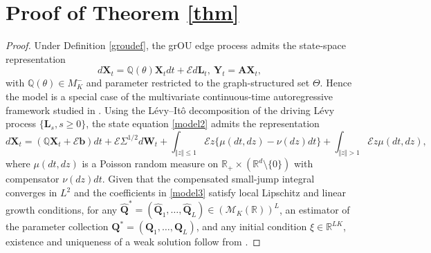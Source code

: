 \documentclass[12pt]{amsart}
\numberwithin{equation}{section}
\newcommand{\R}{\mathbb{R}}
\newcommand{\1}{\mathbf{1}}
\begin{document}
\section{Proof of Theorem \ref{thm}}
\label{thm_proof}
\begin{proof}
Under Definition \ref{groudef}, the grOU edge process admits the state-space representation
\begin{equation*}
d\mathbf{X}_t = \mathbb{Q}(\theta)\mathbf{X}_tdt + \mathcal{E}d\mathbf{L}_t,~\mathbf{Y}_t = \mathbf{AX}_t,
\end{equation*}
with $\mathbb{Q}(\theta)\in M_K^-$ and parameter restricted to the graph-structured set $\Theta$. Hence the model is a special case of the multivariate continuous-time autoregressive framework studied in \cite{lucchese2026estimation}. Using the L\'evy–It\^o decomposition of the driving L\'evy process $\{\mathbf{L}_s,s\geq 0\}$, the state equation \eqref{model2} admits the representation
\begin{equation}
\label{model3}
    d\mathbf{X}_t = (\mathbf{\mathbb{Q}}\mathbf{X}_t+\mathcal{E}\mathbf{b})dt + \mathcal{E}\Sigma^{1/2}d\mathbf{W}_t + \int_{\Vert z\Vert\leq 1}\mathcal{E}z\{\mu(dt,dz)-\nu(dz)dt\} + \int_{\Vert z\Vert>1}\mathcal{E}z\mu(dt,dz),
\end{equation}
where $\mu(dt,dz)$ is a Poisson random measure on $\R_+\times(\R^d\setminus\{0\})$ with compensator $\nu(dz)dt$. Given that the compensated small-jump integral converges in $L^2$ and the coefficients in \eqref{model3} satisfy local Lipschitz and linear growth conditions, for any $\hat{\mathbf{Q}}^*=(\hat{\mathbf{Q}}_1,\dots,\hat{\mathbf{Q}}_L)\in(\mathcal{M}_K(\R))^L$, an estimator of the parameter collection $\mathbf{Q}^* = (\mathbf{Q}_1,\dots,\mathbf{Q}_L)$, and any initial condition $\xi\in\R^{LK}$, existence and uniqueness of a weak solution follow from \cite[Proposition II.2.32]{jacod2013limit}. 


\end{proof}
\end{document}
